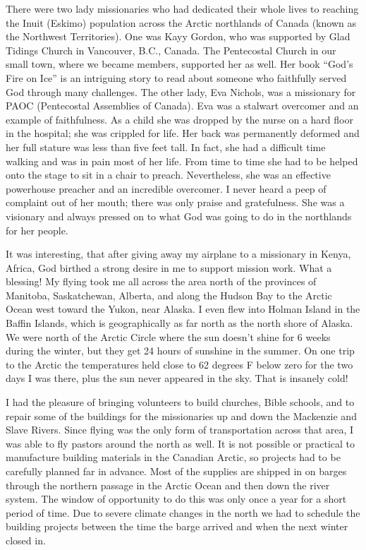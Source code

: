 \documentclass[oneside]{book}
\begin{document}
There were two lady missionaries who had dedicated their whole lives to reaching the Inuit (Eskimo) population across the Arctic northlands of Canada (known as the Northwest Territories). One was Kayy Gordon, who was supported by Glad Tidings Church in Vancouver, B.C., Canada. The Pentecostal Church in our small town, where we became members, supported her as well. Her book “God's Fire on Ice” is an intriguing story to read about someone who faithfully served God through many challenges. The other lady, Eva Nichols, was a missionary for PAOC (Pentecostal Assemblies of Canada). Eva was a stalwart overcomer and an example of faithfulness. As a child she was dropped by the nurse on a hard floor in the hospital; she was crippled for life. Her back was permanently deformed and her full stature was less than five feet tall. In fact, she had a difficult time walking and was in pain most of her life. From time to time she had to be helped onto the stage to sit in a chair to preach. Nevertheless, she was an effective powerhouse preacher and an incredible overcomer. I never heard a peep of complaint out of her mouth; there was only praise and gratefulness. She was a visionary and always pressed on to what God was going to do in the northlands for her people.

It was interesting, that after giving away my airplane to a missionary in Kenya, Africa, God birthed a strong desire in me to support mission work. What a blessing! My flying took me all across the area north of the provinces of Manitoba, Saskatchewan, Alberta, and along the Hudson Bay to the Arctic Ocean west toward the Yukon, near Alaska. I even flew into Holman Island in the Baffin Islands, which is geographically as far north as the north shore of Alaska. We were north of the Arctic Circle where the sun doesn't shine for 6 weeks during the winter, but they get 24 hours of sunshine in the summer. On one trip to the Arctic the temperatures held close to 62 degrees F below zero for the two days I was there, plus the sun never appeared in the sky. That is insanely cold!

I had the pleasure of bringing volunteers to build churches, Bible schools, and to repair some of the buildings for the missionaries up and down the Mackenzie and Slave Rivers. Since flying was the only form of transportation across that area, I was able to fly pastors around the north as well. It is not possible or practical to manufacture building materials in the Canadian Arctic, so projects had to be carefully planned far in advance. Most of the supplies are shipped in on barges through the northern passage in the Arctic Ocean and then down the river system. The window of opportunity to do this was only once a year for a short period of time. Due to severe climate changes in the north we had to schedule the building projects between the time the barge arrived and when the next winter closed in.
\end{document}
